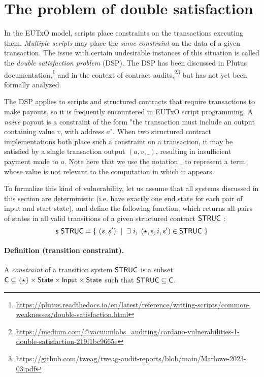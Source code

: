 \section{The problem of double satisfaction}
\label{sec:doublesat}

In the EUTxO model, scripts place constraints on the transactions executing them.
\emph{Multiple scripts} may place the \emph{same constraint} on the data
of a given transaction. The issue with certain undesirable instances of this situation
is called the \emph{double satisfaction problem} (DSP).
The DSP has been discussed in Plutus documentation,\footnote{%
\url{https://plutus.readthedocs.io/en/latest/reference/writing-scripts/common-weaknesses/double-satisfaction.html}
} and in the context of contract audits,\footnote{%
\url{https://medium.com/@vacuumlabs_auditing/cardano-vulnerabilities-1-double-satisfaction-219f1bc9665e}
}\footnote{%
\url{https://github.com/tweag/tweag-audit-reports/blob/main/Marlowe-2023-03.pdf}
}
but has not yet been formally analyzed.

The DSP applies to scripts and structured contracts
that require transactions to make payouts, so it is frequently
encountered in EUTxO script programming. A \emph{naive} payout is a constraint of the
form "the transaction must include an output containing value $v$, with address $a$".
When two structured contract implementations both place such a constraint on a transaction,
it may be satisfied by a single transaction output $(a, v, \_)$, resulting in
insufficient payment made to $a$. Note here that we use
the notation $\_$ to represent a term whose value is not
relevant to the computation in which it appears.

To formalize this kind of vulnerability, let us assume that all systems discussed
in this section are deterministic (i.e. have exactly one end state for each
pair of input and start state),
and define the following function, which returns all pairs of states in all valid transitions
of a given structured contract $\mathsf{STRUC}$ :
\[ \mathsf{s}~\mathsf{STRUC} = \{~ (s, s')~\mid~\exists~i,~(\star, s, i, s') \in \mathsf{STRUC}~\} \]

\paragraph{Definition (transition constraint). }
A \emph{constraint} of a transition system $\mathsf{STRUC}$ is a subset
$\mathsf{C} \subseteq \{\star\} \times \mathsf{State} \times \mathsf{Input} \times \mathsf{State}$
such that $\mathsf{STRUC} \subseteq \mathsf{C}$.

